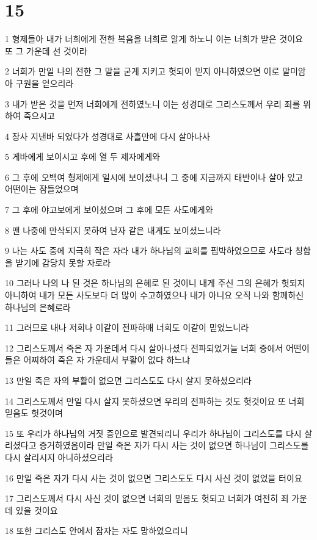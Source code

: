\chapter{15}

\par 1 형제들아 내가 너희에게 전한 복음을 너희로 알게 하노니 이는 너희가 받은 것이요 또 그 가운데 선 것이라
\par 2 너희가 만일 나의 전한 그 말을 굳게 지키고 헛되이 믿지 아니하였으면 이로 말미암아 구원을 얻으리라
\par 3 내가 받은 것을 먼저 너희에게 전하였노니 이는 성경대로 그리스도께서 우리 죄를 위하여 죽으시고
\par 4 장사 지낸바 되었다가 성경대로 사흘만에 다시 살아나사
\par 5 게바에게 보이시고 후에 열 두 제자에게와
\par 6 그 후에 오백여 형제에게 일시에 보이셨나니 그 중에 지금까지 태반이나 살아 있고 어떤이는 잠들었으며
\par 7 그 후에 야고보에게 보이셨으며 그 후에 모든 사도에게와
\par 8 맨 나중에 만삭되지 못하여 난자 같은 내게도 보이셨느니라
\par 9 나는 사도 중에 지극히 작은 자라 내가 하나님의 교회를 핍박하였으므로 사도라 칭함을 받기에 감당치 못할 자로라
\par 10 그러나 나의 나 된 것은 하나님의 은혜로 된 것이니 내게 주신 그의 은혜가 헛되지 아니하여 내가 모든 사도보다 더 많이 수고하였으나 내가 아니요 오직 나와 함께하신 하나님의 은혜로라
\par 11 그러므로 내나 저희나 이같이 전파하매 너희도 이같이 믿었느니라
\par 12 그리스도께서 죽은 자 가운데서 다시 살아나셨다 전파되었거늘 너희 중에서 어떤이들은 어찌하여 죽은 자 가운데서 부활이 없다 하느냐
\par 13 만일 죽은 자의 부활이 없으면 그리스도도 다시 살지 못하셨으리라
\par 14 그리스도께서 만일 다시 살지 못하셨으면 우리의 전파하는 것도 헛것이요 또 너희 믿음도 헛것이며
\par 15 또 우리가 하나님의 거짓 증인으로 발견되리니 우리가 하나님이 그리스도를 다시 살리셨다고 증거하였음이라 만일 죽은 자가 다시 사는 것이 없으면 하나님이 그리스도를 다시 살리시지 아니하셨으리라
\par 16 만일 죽은 자가 다시 사는 것이 없으면 그리스도도 다시 사신 것이 없었을 터이요
\par 17 그리스도께서 다시 사신 것이 없으면 너희의 믿음도 헛되고 너희가 여전히 죄 가운데 있을 것이요
\par 18 또한 그리스도 안에서 잠자는 자도 망하였으리니
